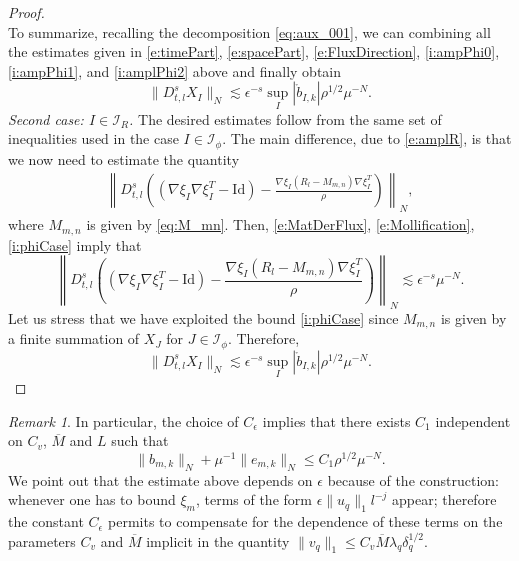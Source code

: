 \documentclass[10pt,a4paper]{amsart}
\numberwithin{equation}{section}
\numberwithin{corollario}{section}
\numberwithin{lemma}{section}
\numberwithin{prop}{section}
\theoremstyle{definition}
\theoremstyle{remark}
\newtheorem{oss}[thm]{Remark}
\newcommand{\I}{\mathcal{I}}
\newcommand{\Id}{\mathrm{Id}}
\newcommand{\oM}{\overline{M}}
\begin{document}
\begin{proof}
\begin{equation}
      \end{equation}
To summarize, recalling the decomposition \eqref{eq:aux_001}, we can combining all the estimates given in \eqref{e:timePart}, \eqref{e:spacePart}, \eqref{e:FluxDirection}, \eqref{i:ampPhi0}, \eqref{i:ampPhi1}, and \eqref{i:amplPhi2} above and finally obtain
    \begin{equation}\label{i:phiCase}
        \|D_{t,l}^s{X}_I\|_N\lesssim \epsilon^{-s} \sup_{I}|\mathring{b}_{I,k}|\rho^{1/2}\mu^{-N}.
    \end{equation}
      \textit{Second case: $I\in \I_{R}$.}
      The desired estimates follow from the same set of inequalities used in the case $I\in \I_{\phi}$. The main difference, due to \eqref{e:amplR}, is that we now need to estimate the quantity
      \begin{align}
          \left\|D_{t,l}^s\left((\nabla\xi_I\nabla\xi_I^T-\Id)-\frac{\nabla\xi_I(R_l-M_{m,n})\nabla\xi_I^T}{\rho}\right)\right\|_N,
      \end{align}
      where $M_{m,n}$ is given by \eqref{eq:M_mn}.
      Then, \eqref{e:MatDerFlux}, \eqref{e:Mollification}, \eqref{i:phiCase} imply that
      \begin{equation}
          \left\|D_{t,l}^s\left((\nabla\xi_I\nabla\xi_I^T-\Id)-\frac{\nabla\xi_I(R_l-M_{m,n})\nabla\xi_I^T}{\rho}\right)\right\|_N\lesssim \epsilon^{-s} \mu^{-N}.
      \end{equation}
      Let us stress that we have exploited the bound \eqref{i:phiCase} since $M_{m,n}$ is given by a finite summation of $X_J$ for $J \in \I_{\phi}$.
       Therefore,
       \begin{equation}\label{i:RCase}
        \|D_{t,l}^sX_I\|_N\lesssim \epsilon^{-s} \sup_{I}|\mathring{b}_{I,k}|\rho^{1/2}\mu^{-N}.
    \end{equation}
\end{proof}
\begin{oss}\label{oss:IndependenceOnML}
    In particular, the choice of $C_\epsilon$ implies that there exists $C_1$ independent on $C_v$, $\overline{M}$ and $L$ such that
    \begin{equation}
        \|b_{m,k} \|_N+\mu^{-1}\|e_{m,k}\|_N\le C_1\rho^{1/2}\mu^{-N}.
    \end{equation}
We point out that the estimate above depends on $\epsilon$ because of the construction: whenever one has to bound $\xi_m$, terms of the form $\epsilon\|u_q\|_1l^{-j}$ appear; therefore the constant $C_\epsilon$ permits to compensate for the dependence of these terms on the parameters $C_v$ and $\overline{M}$ implicit in the quantity $\|v_q\|_1\le C_v \oM\lambda_q\delta_q^{1/2}$.
\end{oss}
\end{document}

